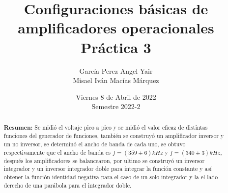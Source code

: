 \documentclass[DIV=calc, paper=a4, fontsize=11pt]{scrartcl}
\title{Configuraciones básicas de amplificadores operacionales\\ %
Práctica 3} %
\author{García Perez Angel Yair\\
Misael Iván Macías Márquez}
\date{Viernes 8 de Abril de 2022\\Semestre 2022-2}
\begin{document}
\maketitle


\begin{abstract}
\textbf{Resumen:} Se midió el voltaje pico a pico y se midió el valor eficaz de distintas funciones del generador de funciones, también se construyó un amplificador inversor y un no inversor, se determinó el ancho de banda de cada uno, se obtuvo respectivamente que el ancho de banda es $f= (359\pm6) kHz$ y $f= (340\pm3) kHz$, después los amplificadores se balancearon, por ultimo se construyó un inversor integrador y un inversor integrador doble para integrar la función constante y así obtener la función identidad negativa para el caso de un solo integrador y la el lado derecho de una parábola para el integrador doble.

\end{abstract}
\end{document}
